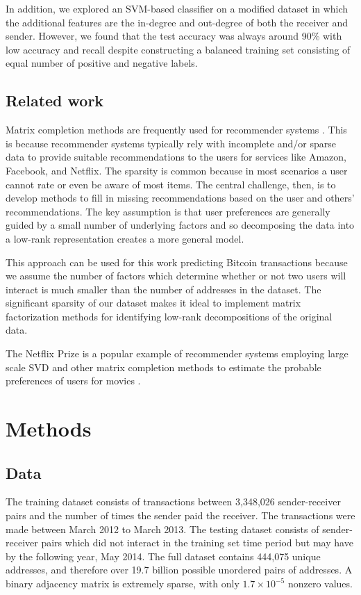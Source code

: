 \documentclass{article} %
\begin{document}
In addition, we explored an SVM-based classifier on a modified dataset in which the additional features are the in-degree and out-degree of both the receiver and sender. However, we found that the test accuracy was always around 90\% with low accuracy and recall despite constructing a balanced training set consisting of equal number of positive and negative labels.

\subsection{Related work}

Matrix completion methods are frequently used for recommender systems \cite{koren2009matrix}. This is because recommender systems typically rely with incomplete and/or sparse data to provide suitable recommendations to the users for services like Amazon, Facebook, and Netflix. The sparsity is common because in most scenarios a user cannot rate or even be aware of most items. The central challenge, then, is to develop methods to fill in missing recommendations based on the user and others' recommendations. The key assumption is that user preferences are generally guided by a small number of underlying factors and so decomposing the data into a low-rank representation creates a more general model.

This approach can be used for this work predicting Bitcoin transactions because we assume the number of factors which determine whether or not two users will interact is much smaller than the number of addresses in the dataset. The significant sparsity of our dataset makes it ideal to implement matrix factorization methods for identifying low-rank decompositions of the original data.

The Netflix Prize is a popular example of recommender systems employing large scale SVD and other matrix completion methods to estimate the probable preferences of users for movies \cite{bennett2007netflix}.

\section{Methods}

\subsection{Data}

The training dataset consists of transactions between 3,348,026 sender-receiver pairs and the number of times the sender paid the receiver. The transactions were made between March 2012 to March 2013. The testing dataset consists of sender-receiver pairs which did not interact in the training set time period but may have by the following year, May 2014. The full dataset contains 444,075 unique addresses, and therefore over 19.7 billion possible unordered pairs of addresses. A binary adjacency matrix is extremely sparse, with only $1.7 \times 10^{-5}$ nonzero values.
\end{document}
